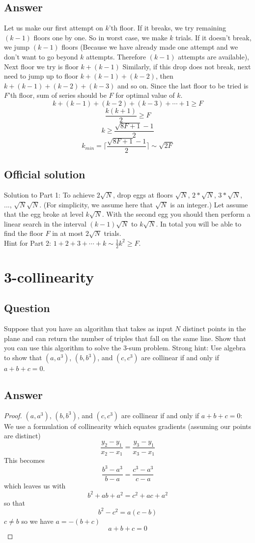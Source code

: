 \documentclass[12pt]{article}
\numberwithin{equation}{section}
\begin{document}
\subsection*{Answer}
Let us make our first attempt on $k$'th floor.
If it breaks, we try remaining $(k-1)$ floors one by one. 
So in worst case, we make $k$ trials.
If it doesn’t break, we jump $(k-1)$ floors (Because we have
already made one attempt and we don't want to go beyond 
$k$ attempts. Therefore $(k-1)$ attempts are available),
Next floor we try is floor $k + (k-1)$
Similarly, if this drop does not break, next need to jump 
up to floor $k + (k-1) + (k-2)$, then $k + (k-1) + (k-2) + (k-3)$
and so on.
Since the last floor to be tried is $F$'th floor, sum of
series should be $F$ for optimal value of $k$.
\[k + (k-1) + (k-2) + (k-3) + \cdots + 1 \geqslant F\]
\[\frac{k(k+1)}{2} \geqslant F\]
\[k \geqslant \frac{\sqrt{8F+1}-1}{2}\]
\[k_{min} = \lceil \frac{\sqrt{8F+1}-1}{2} \rceil \sim \sqrt{2F}\] 
\subsection*{Official solution}
Solution to Part 1: To achieve $2\sqrt{N}$, drop eggs at floors $\sqrt{N}$,
$2*\sqrt{N}$, $3*\sqrt{N}$, ..., $\sqrt{N}\sqrt{N}$. (For simplicity, we assume
here that $\sqrt{N}$ is an integer.) Let assume that the egg broke at level
$k\sqrt{N}$. With the second egg you should then perform a linear search in the
interval $(k-1)\sqrt{N}$ to $k\sqrt{N}$. In total you will be able to find the
floor $F$ in at most $2\sqrt{N}$ trials.\\
Hint for Part 2: $1 + 2 + 3 + \cdots + k \sim \frac{1}{2}k^2 \geqslant F$. 

\newpage
\section{3-collinearity}
\subsection*{Question}
Suppose that you have an algorithm that takes as input $N$ distinct
points in the plane and can return the number of triples that fall on the same line.
Show that you can use this algorithm to solve the 3-sum problem. Strong hint: Use
algebra to show that $(a, a^3)$, $(b, b^3)$, and $(c, c^3)$ are collinear if and only if $a + b + c = 0$.
\subsection*{Answer}
\begin{proof}
    $(a, a^3)$, $(b, b^3)$, and $(c, c^3)$ are collinear if and only if $a + b + c = 0$: \\
    We use a formulation of collinearity which equates gradients (assuming our points are distinct) 
    \[\frac{y_2-y_1}{x_2-x_1}=\frac{y_3-y_1}{x_3-x_1}\]
    This becomes
    \[\frac{b^3-a^3}{b-a}=\frac{c^3-a^3}{c-a}\]
    which leaves us with
    \[b^2+ab+a^2=c^2+ac+a^2\]
    so that
    \[b^2-c^2=a(c-b)\]
    $c \neq b$ so we have $a=-(b+c)$
    \[a+b+c=0\]
\end{proof}
\end{document}
